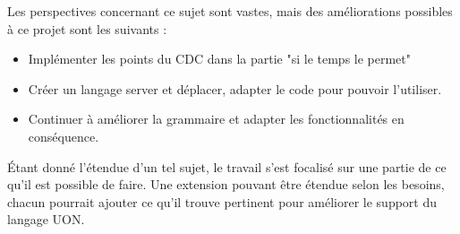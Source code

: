 Les perspectives concernant ce sujet sont vastes, mais des améliorations possibles à ce projet sont les suivants :
\begin{itemize}
    \item Implémenter les points du CDC dans la partie "si le temps le permet"
    \item Créer un langage server et déplacer, adapter le code pour pouvoir l'utiliser.
    \item Continuer à améliorer la grammaire et adapter les fonctionnalités en conséquence.
\end{itemize}

Étant donné l'étendue d'un tel sujet, le travail s'est focalisé sur une partie de ce qu'il est possible de faire.
Une extension pouvant être étendue selon les besoins, chacun pourrait ajouter ce qu'il trouve pertinent pour améliorer le support du langage UON.

